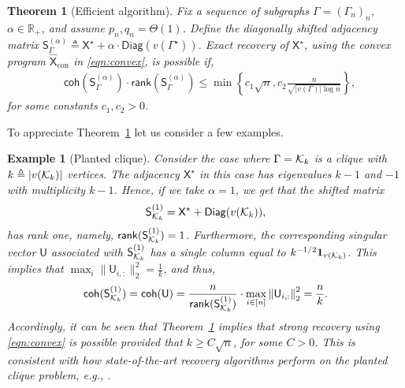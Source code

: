 \documentclass[12pt]{article}
\newtheorem{example}{Example}
\newtheorem{theorem}{Theorem}
\newcommand{\Jb}{\mathbf{J}}
\newcommand{\calK}{{\cal K}}
\newcommand{\ppp}[1]{\left\{#1\right\}}
\newcommand{\norm}[1]{\left\|#1\right\|}
\newcommand{\innerP}[1]{\left\langle#1\right\rangle}
\newcommand{\s}[1]{\mathsf{#1}}
\begin{document}
\begin{theorem}[Efficient algorithm]\label{thm:effAlg}
Fix a sequence of subgraphs $\Gamma=(\Gamma_n)_n$, $\alpha\in\mathbb{R}_+$, and assume $p_n,q_n=\Theta(1)$. Define the diagonally shifted adjacency matrix $\s{S}^{(\alpha)}_\Gamma\triangleq\s{X}^\star+\alpha\cdot\s{Diag}(v(\Gamma^\star))$. Exact recovery of $\s{X}^\star$, using the convex program $\hat{\s{X}}_{\mathrm{con}}$ in \eqref{eqn:convex}, is possible if,
\begin{align}
        &\s{coh}(\s{S}^{(\alpha)}_\Gamma)\cdot\s{rank}(\s{S}^{(\alpha)}_\Gamma)\leq \min\ppp{c_1\sqrt{n},c_2\frac{n}{\sqrt{|v(\Gamma)|\log n}}},\label{eqn:TwoCondMain}
\end{align}
for some constants $c_1,c_2>0$.
\end{theorem}
To appreciate Theorem~\ref{thm:effAlg} let us consider a few examples.
\begin{example}[Planted clique]\label{exmp:1}
Consider the case where $\Gamma=\calK_k$ is a clique with $k\triangleq |v(\calK_k)|$ vertices. The adjacency $\s{X}^\star$ in this case has eigenvalues $k-1$ and $-1$ with multiplicity $k-1$. Hence, if we take $\alpha=1$, we get that the shifted matrix
\begin{align}
\s{S}^{(1)}_{\calK_k}=\s{X}^\star+\s{Diag}(v(\calK_k)),
\end{align}
has rank one, namely, $\s{rank}(\s{S}^{(1)}_{\calK_k})=1$. Furthermore, the corresponding singular vector $\s{U}$ associated with $\s{S}^{(1)}_{\calK_k}$ has a single column equal to $k^{-1/2}\mathbf{1}_{v(\calK_k)}$. This implies that $\max_i \|\s{U}_{i,:}\|_2^2= \frac{1}{k}$, and thus,
\begin{align}
\s{coh}(\s{S}^{(1)}_{\calK_k}) = \s{coh}(\s{U})=\frac{n}{\s{rank}(\s{S}^{(1)}_{\calK_k})}\cdot\max_{i\in[n]}\norm{\mathsf{U}_{i,:}}_2^2 = \frac{n}{k}.
\end{align}
Accordingly, it can be seen that Theorem~\ref{thm:effAlg} implies that strong recovery using \eqref{eqn:convex} is possible provided that $k\geq C\sqrt{n}$, for some $C>0$. This is consistent with how state-of-the-art recovery algorithms perform on the planted clique problem, e.g., \cite{alon1998finding,dekel2014finding,montanari2015finding,hajek2016achieving,chen2016statistical}.
\end{example}
\end{document}
